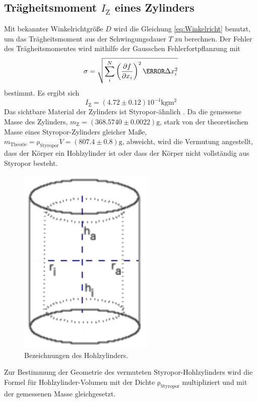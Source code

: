 \subsection{Trägheitsmoment $I_\text{Z}$ eines Zylinders}
\label{sub:traegheitsmoment_eines_zylinders}

\noindent Mit bekannter Winkelrichtgröße $D$ wird die Gleichung \eqref{eq:Winkelricht} benutzt, um das Trägheitsmoment aus der Schwingungsdauer $T$ zu berechnen. Der Fehler des Trägheitsmomentes wird mithilfe der Gausschen Fehlerfortpflanzung mit
\begin{equation}
	\label{eq:Gauss}
	\sigma=\sqrt{\sum_i^N{\left( \frac{\partial{f}}{\partial{x_i}}\right)^2\m \Delta x_i^2}}
\end{equation}bestimmt.
Es ergibt sich
\begin{equation}
	\label{wert:Zylinder}
	I_\text{Z} = (4.72\pm0.12)10^{-4} \si{\kilo\gram\meter\squared}
\end{equation}
Das sichtbare Material der Zylinders ist Styropor-ähnlich \cite{dichte_styropor}.
Da die gemessene Masse des Zylinders, $m_\text{Z} = (368.5740\pm0.0022) \si{\gram}$, stark von der theoretischen Masse eines Styropor-Zylinders gleicher Maße, $m_\text{Theorie} = \mathup{\rho_{\text{Styropor}}}V=(807.4\pm0.8) \si{\gram}$, abweicht, 
wird die Vermutung angestellt, dass der Körper ein Hohlzylinder ist oder dass der Körper nicht vollständig aus Styropor besteht.
\begin{figure}[b]
	\label{fig:tonne}
	\centering
	\includegraphics[scale=0.5]{Bilder/Tonne.pdf}
	\caption{Bezeichnungen des Hohlzylinders.}
\end{figure}
Zur Bestimmung der Geometrie des vermuteten Styropor-Hohlzylinders wird die Formel für Hohlzylinder-Volumen mit der Dichte $\mathup{\rho_{\text{Styropor}}}$ multipliziert und mit der gemessenen Masse gleichgesetzt. 

